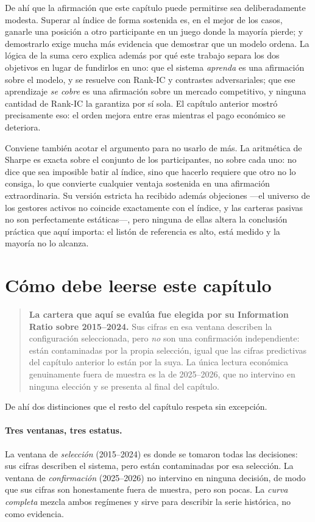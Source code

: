 De ahí que la afirmación que este capítulo puede permitirse sea deliberadamente modesta. Superar al
índice de forma sostenida es, en el mejor de los casos, ganarle una posición a otro participante en
un juego donde la mayoría pierde; y demostrarlo exige mucha más evidencia que demostrar que un modelo
ordena. La lógica de la suma cero explica además por qué este trabajo separa los dos objetivos en
lugar de fundirlos en uno: que el sistema \emph{aprenda} es una afirmación sobre el modelo, y se
resuelve con Rank-IC y contrastes adversariales; que ese aprendizaje \emph{se cobre} es una
afirmación sobre un mercado competitivo, y ninguna cantidad de Rank-IC la garantiza por sí sola. El
capítulo anterior mostró precisamente eso: el orden mejora entre eras mientras el pago económico se
deteriora.

Conviene también acotar el argumento para no usarlo de más. La aritmética de Sharpe es exacta sobre
el conjunto de los participantes, no sobre cada uno: no dice que sea imposible batir al índice, sino
que hacerlo requiere que otro no lo consiga, lo que convierte cualquier ventaja sostenida en una
afirmación extraordinaria. Su versión estricta ha recibido además objeciones —el universo de los
gestores activos no coincide exactamente con el índice, y las carteras pasivas no son perfectamente
estáticas—, pero ninguna de ellas altera la conclusión práctica que aquí importa: el listón de
referencia es alto, está medido y la mayoría no lo alcanza.

\section{Cómo debe leerse este capítulo}
\label{sec:advertencia-economica}

\begin{quote}
\textbf{La cartera que aquí se evalúa fue elegida por su Information Ratio sobre 2015--2024.} Sus
cifras en esa ventana describen la configuración seleccionada, pero \emph{no} son una confirmación
independiente: están contaminadas por la propia selección, igual que las cifras predictivas del
capítulo anterior lo están por la suya. La única lectura económica genuinamente fuera de muestra es
la de 2025--2026, que no intervino en ninguna elección y se presenta al final del capítulo.
\end{quote}

De ahí dos distinciones que el resto del capítulo respeta sin excepción.

\paragraph{Tres ventanas, tres estatus.} La ventana de \emph{selección} (2015--2024) es donde se
tomaron todas las decisiones: sus cifras describen el sistema, pero están contaminadas por esa
selección. La ventana de \emph{confirmación} (2025--2026) no intervino en ninguna decisión, de modo
que sus cifras son honestamente fuera de muestra, pero son pocas. La \emph{curva completa} mezcla
ambos regímenes y sirve para describir la serie histórica, no como evidencia.

